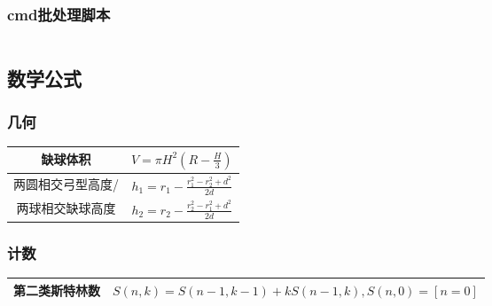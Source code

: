 \documentclass[utf8]{ctexart}
\begin{document}
\subsubsection{cmd批处理脚本}
\inputminted[linenos,breaklines,tabsize=4,mathescape,texcl]{bat}{codes/check-bat.bat}

\subsection{数学公式}

\subsubsection{几何}

\begin{spacing}{2}
\begin{center}
\begin{tabular}{ |c|c| }
	\hline
	缺球体积				& $V = \pi H^2\left(R-\frac{H}{3}\right)$		\\
	\hline
	两圆相交弓型高度/		& $h_1 = r_1 - \frac{r_1^2 - r_2^2 + d^2}{2d}$	\\
	两球相交缺球高度		& $h_2 = r_2 - \frac{r_2^2 - r_1^2 + d^2}{2d}$	\\
	\hline
\end{tabular}
\end{center}
\end{spacing}

\subsubsection{计数}

\begin{spacing}{2}
\begin{center}
\begin{tabular}{ |c|c| }
	\hline
	第二类斯特林数				& $S(n, k) = S(n-1, k-1) + k S(n-1, k), S(n, 0) = [n = 0]$		\\
	\hline
\end{tabular}
\end{center}
\end{spacing}
\end{document}
